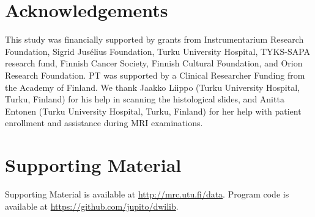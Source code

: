 \documentclass[10pt,letterpaper]{article}
\begin{document}
%
\newpage
\section{Acknowledgements}

This study was financially supported by grants from Instrumentarium Research
Foundation, Sigrid Jusélius Foundation, Turku University Hospital, TYKS-SAPA
research fund, Finnish Cancer Society, Finnish Cultural Foundation, and Orion
Research Foundation. PT was supported by a Clinical Researcher Funding from the
Academy of Finland. We thank Jaakko Liippo (Turku University Hospital, Turku,
Finland) for his help in scanning the histological slides, and Anitta Entonen
(Turku University Hospital, Turku, Finland) for her help with patient enrollment
and assistance during MRI examinations.

%
\newpage
\newcommand{\fig}[2]{\item Patient #1: #2 map, prostate mask, lesion masks.}
\newcommand{\figADCm}[1]{\fig{#1}{ADCₘ}}
\newcommand{\figTtw}[1]{\fig{#1}{T₂w}}
\newcommand{\figTt}[1]{\fig{#1}{T₂}}

\newcommand{\histology}[2]{\item Patient #1: #2.}
\newcommand{\pink}[1]{\histology{#1}{prostatectomy section}}


\section{Supporting Material}

Supporting Material is available at \url{http://mrc.utu.fi/data}. Program code
is available at \url{https://github.com/jupito/dwilib}.
\end{document}
